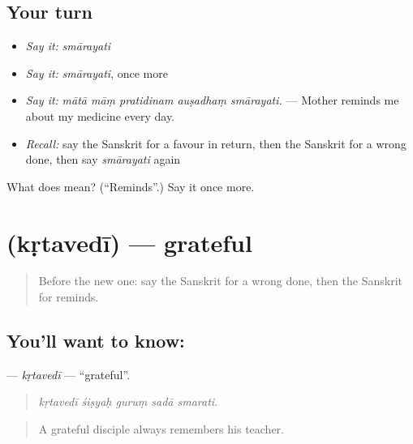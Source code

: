 \subsection*{Your turn}
\begin{itemize}
\raggedright
  \item \emph{Say it:} \emph{smārayati}
  \item \emph{Say it:} \emph{smārayati}, once more
  \item \emph{Say it:} \emph{mātā māṃ pratidinam auṣadhaṃ smārayati.} — Mother reminds me about my medicine every day.
  \item \emph{Recall:} say the Sanskrit for a favour in return, then the Sanskrit for a wrong done, then say \emph{smārayati} again
\end{itemize}

\begin{tcolorbox}[breakable,colback=teal!4,colframe=teal!35!black,title={Before you move on}]
What does  mean? (\textquotedblleft{}Reminds\textquotedblright{}.) Say it once more.
\end{tcolorbox}
\section[\texorpdfstring{\sk{कृतवेदी} (kṛtavedī)}{कृतवेदी (kṛtavedī)}]{ (kṛtavedī) — grateful}

\label{lesson:SA-C468-krtavedi}



\begin{quote}
Before the new one: say the Sanskrit for a wrong done, then the Sanskrit for reminds.
\end{quote}

\subsection*{You'll want to know: }
\textbf{} — \emph{kṛtavedī} — \textquotedblleft{}grateful\textquotedblright{}.

\begin{quote}
    
\end{quote}

\begin{quote}
\emph{kṛtavedī śiṣyaḥ guruṃ sadā smarati.}
\end{quote}

\begin{quote}
A grateful disciple always remembers his teacher.
\end{quote}

